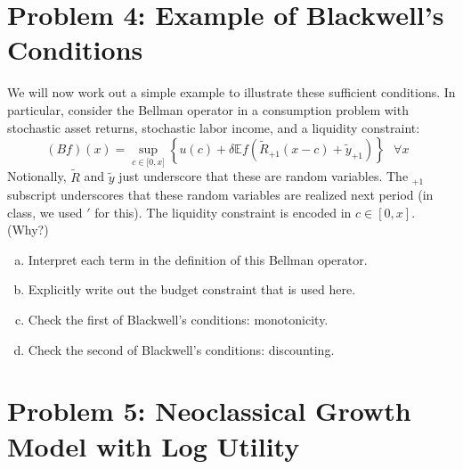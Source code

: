 \documentclass[11pt]{extarticle}
\theoremstyle{plain}
\theoremstyle{definition}
\begin{document}
\vspace{5mm}
\section*{Problem 4: Example of Blackwell's Conditions}

We will now work out a simple example to illustrate these sufficient conditions. In particular, consider the Bellman operator in a consumption problem with stochastic asset returns, stochastic labor income, and a liquidity constraint:
\begin{equation*}
	(Bf)(x)=\sup_{c\in \lbrack 0,x]}\left\{ u(c)+\delta \mathbb Ef(\tilde{R}_{+1}(x-c)+
	\tilde{y}_{+1})\right\} \text{ \ }\forall x\text{\ } 
\end{equation*}
Notionally, $\tilde R$ and $\tilde y$ just underscore that these are random variables. The $_{+1}$ subscript underscores that these random variables are realized next period (in class, we used $'$ for this). The liquidity constraint is encoded in $c \in [0, x]$. (Why?)


\vspace{5mm}
\noindent
\begin{enumerate}[(a)]
\item Interpret each term in the definition of this Bellman operator.

\item Explicitly write out the budget constraint that is used here.

\item Check the first of Blackwell's conditions: monotonicity.

\item Check the second of Blackwell's conditions: discounting.
\end{enumerate}



\vspace{5mm}
\section*{Problem 5: Neoclassical Growth Model with Log Utility}
\end{document}
